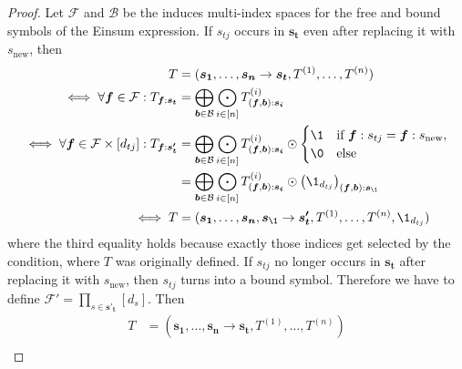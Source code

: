 \begin{proof}
    \small
    Let $\mathcal{F}$ and $\mathcal{B}$ be the induces multi-index spaces for the free and bound symbols of the Einsum expression.
    If $s_{tj}$ occurs in $\bm{s_t}$ even after replacing it with $s_{\text{new}}$, then
    \begin{align*}
        T                                                                         & = (\bm{s_1}, \dots, \bm{s_n} \rightarrow \bm{s_t}, T^{(1)}, \dots, T^{(n)})                                                                                             \\
        \iff \forall \bm{f} \in \mathcal{F}: T_{\bm{f}:\bm{s_t}}                  & = \bigoplus\limits_{\bm{b} \in \mathcal{B}} \bigodot\limits_{i \in [n]} T^{(i)}_{(\bm{f}, \bm{b}):\bm{s_i}}                                                             \\
        \iff \forall \bm{f} \in \mathcal{F} \times [d_{tj}]: T_{\bm{f}:\bm{s'_t}} & = \bigoplus\limits_{\bm{b} \in \mathcal{B}} \bigodot\limits_{i \in [n]} T^{(i)}_{(\bm{f}, \bm{b}):\bm{s_i}} \odot \begin{cases}
            \1 & \text{if $\bm{f}: s_{tj} = \bm{f}: s_{\text{new}}$}, \\
            \0 & \text{else}
        \end{cases}                             \\
                                                                                  & = \bigoplus\limits_{\bm{b} \in \mathcal{B}} \bigodot\limits_{i \in [n]} T^{(i)}_{(\bm{f}, \bm{b}):\bm{s_i}} \odot \left(\1_{d_{tj}}\right)_{(\bm{f}, \bm{b}):\bm{s_\1}} \\
        \iff T                                                                    & = (\bm{s_1}, \dots, \bm{s_n}, \bm{s_\1} \rightarrow \bm{s'_t}, T^{(1)}, \dots, T^{(n)}, \1_{d_{tj}})
    \end{align*}
    where the third equality holds because exactly those indices get selected by the condition, where $T$ was originally defined.
    If $s_{tj}$ no longer occurs in $\bm{s_t}$ after replacing it with $s_{\text{new}}$, then $s_{tj}$ turns into a bound symbol.
    Therefore we have to define $\mathcal{F}' = \prod_{s \in \bm{s'_t}} [d_s]$.
    Then
    \begin{align*}
        T                                                          & = (\bm{s_1}, \dots, \bm{s_n} \rightarrow \bm{s_t}, T^{(1)}, \dots, T^{(n)})                                                                                                             \\

\end{align*}
\end{proof}
